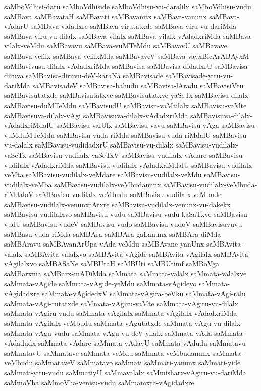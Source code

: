 {saMboVdhisi-daru
saMboVdhiside
saMboVdhisu-vu-daralilx
saMboVdhisu-vudu
saMBava
saMBavataH
saMBavati
saMBavanitx
saMBava-vanunx
saMBava-vAdarU
saMBava-vidadxre
saMBava-virutatxde
saMBava-viru-vu-dariMda
saMBava-viru-vu-dilalx
saMBava-vilalx
saMBava-vilalx-vAdadxriMda
saMBava-vilalx-veMdu
saMBavavu
saMBava-vuMTeMdu
saMBavavU
saMBavave
saMBava-velilx
saMBava-velilxMda
saMBavaveV
saMBava-vayxBicArABAyxM
saMBavivusu-dilalx-vAdadxriMda
saMBavisa
saMBavisa-didadxrU
saMBavisa-diruva
saMBavisa-diruvu-deV-karaNa
saMBavisade
saMBavisade-yiru-vu-dariMda
saMBavisadeV
saMBavisa-bahudu
saMBavisa-lAradu
saMBavisiVtu
saMBavisutatxde
saMBavisutatxve
saMBavisutatxve-yaSeTx
saMBavisu-dilalx
saMBavisu-duMTeMdu
saMBavisudU
saMBavisu-vaMtilalx
saMBavisu-vaMte
saMBavisuva-dilalx-vAgi
saMBavisuva-dilalx-vAdadxriMda
saMBavisuva-dilalx-vAdadxriMdalU
saMBavisu-valUlx
saMBavisu-vavu
saMBavisu-vAga
saMBavisu-vuMduMTeMdu
saMBavisu-vuda-riMda
saMBavisu-vuda-riMdalU
saMBavisu-vu-dalalx
saMBavisu-vudidadxrU
saMBavisu-vu-dilalx
saMBavisu-vudilalx-vaSeTx
saMBavisu-vudilalx-vaSeTxV
saMBavisu-vudilalx-vAdare
saMBavisu-vudilalx-vAdadxriMda
saMBavisu-vudilalx-vAdadxriMdalU
saMBavisu-vudilalx-veMta
saMBavisu-vudilalx-veMdare
saMBavisu-vudilalx-veMdu
saMBavisu-vudilalx-veMba
saMBavisu-vudilalx-veMbudanunx
saMBavisu-vudilalx-veMbuda-riMdaloV
saMBavisu-vudilalx-veMbudu
saMBavisu-vudilalx-veMbude
saMBavisu-vudilalx-venunxtAtxre
saMBavisu-vudilalx-venunx-vu-dakekx
saMBavisu-vudilalxvo
saMBavisu-vudu
saMBavisu-vudu-kaSaTxve
saMBavisu-vudU
saMBavisu-vudeV
saMBavisu-vudo
saMBavisu-vudoV
saMBavisuvuvu
saMBasu-vuda-riMda
saMBAra
saMBAra-gaLanunx
saMBAra-diMda
saMBAravu
saMBAvanArUpa-vAda-veMdu
saMBAvane-yanUnx
saMBAvita-valalx
saMBAvita-valalxvo
saMBAvita-vAgide
saMBAvita-vAgilalx
saMBAvita-vAgilalxvo
saMBASaNe
saMBUtaH
saMBUti
saMBUtimf
saMBoVga
saMBarxma
saMBarx-mADiMda
saMmata
saMmata-valalx
saMmata-valalxve
saMmata-vAgide
saMmata-vAgide-yeMdu
saMmata-vAgideyo
saMmata-vAgidadxre
saMmata-vAgidedxV
saMmata-vAgira-beVku
saMmata-vAgi-ralu
saMmata-vAgi-rutatxde
saMmata-vAgiru-vaMte
saMmata-vAgiru-vu-dilalx
saMmata-vAgiru-vudu
saMmata-vAgilalx
saMmata-vAgilalx-vAdadxriMda
saMmata-vAgilalx-veMbudu
saMmata-vAgutatxde
saMmata-vAgu-vu-dilalx
saMmata-vAgu-vudu
saMmata-vAgu-vu-deV-yilalx
saMmata-vAda
saMmata-vAdadudx
saMmata-vAdare
saMmata-vAdavU
saMmata-vAdudu
saMmatavu
saMmatavU
saMmatave
saMmata-veMdu
saMmata-veMbudanunx
saMmata-veMbudu
saMmataveV
saMmatavo
saMmati
saMmati-yanunx
saMmati-yide
saMmati-yiru-vudu
saMmatiyU
saMmavalalx
saMmisharx-vAgiru-vu-dariMda
saMmoVha
saMmoVha-venisu-vudu
saMmamxta-vAgidadxre
}

